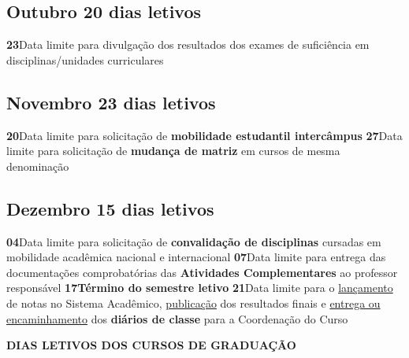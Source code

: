 \documentclass[thesis]{hmcposter}
\begin{document}
\begin{poster}
\subsection{Outubro \hfill 20 dias letivos}\textbf{23}\qquad Data limite para divulgação dos resultados dos exames de suficiência em disciplinas/unidades curriculares \newline \null\subsection{Novembro \hfill 23 dias letivos}\textbf{20}\qquad Data limite para solicitação de \textbf{mobilidade estudantil intercâmpus} \newline \null\textbf{27}\qquad Data limite para solicitação de \textbf{mudança de matriz} em cursos de mesma denominação \newline \null\subsection{Dezembro \hfill 15 dias letivos}\textbf{04}\qquad Data limite para solicitação de \textbf{convalidação de disciplinas} cursadas em mobilidade acadêmica nacional e internacional \newline \null\textbf{07}\qquad Data limite para entrega das documentações comprobatórias das \textbf{Atividades Complementares} ao professor responsável \newline \null\textbf{17}\qquad \textbf{Término do semestre letivo} \newline \null\textbf{21}\qquad Data limite para o \underline{lançamento} de notas no Sistema Acadêmico, \underline{publicação} dos resultados finais e \underline{entrega ou encaminhamento} dos \textbf{diários de classe} para a Coordenação do Curso \newline \null\newpage
~
\vfill
\begin{center}
\large \textbf{DIAS LETIVOS DOS CURSOS DE GRADUAÇÃO}
\newline
\null
\newline
\begin{table}
\centering
{}
\end{table}
\end{center}
\end{poster}
\end{document}
